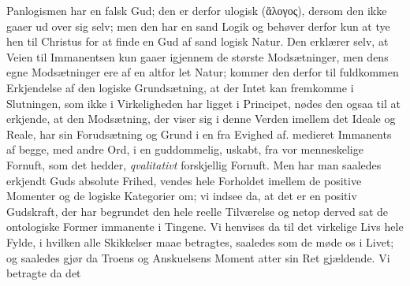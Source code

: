 \documentclass[12pt]{book}
\newcommand{\opage}[1]{\marginnote{\footnotesize\textit{[#1]}}}
\begin{document}
\opage{145} %
Panlogismen har en falsk Gud; den er derfor ulogisk (ἄλογος), dersom den ikke
gaaer ud over sig selv; men den har en sand Logik og behøver derfor kun at tye
hen til Christus for at finde en Gud af sand logisk Natur. Den erklærer selv, at
Veien til Immanentsen kun gaaer igjennem de største Modsætninger, men dens egne
Modsætninger ere af en altfor let Natur; kommer den derfor til fuldkommen
Erkjendelse af den logiske Grundsætning, at der Intet kan fremkomme i Slutningen,
som ikke i Virkeligheden har ligget i Principet, nødes den ogsaa til at erkjende,
at den Modsætning, der viser sig i denne Verden imellem det Ideale og Reale, har
sin Forudsætning og Grund i en fra Evighed af. medieret Immanents af begge, med
andre Ord, i en guddommelig, uskabt, fra vor menneskelige Fornuft, som det
hedder, \emph{qvalitativt} forskjellig Fornuft. Men har man saaledes erkjendt
Guds absolute Frihed, vendes hele Forholdet imellem de positive Momenter og de
logiske Kategorier om; vi indsee da, at det er en positiv Gudskraft, der har
begrundet den hele reelle Tilværelse og netop derved sat de ontologiske Former
immanente i Tingene. Vi henvises da til det virkelige Livs hele Fylde, i hvilken
alle Skikkelser maae betragtes, saaledes som de møde os i Livet; og saaledes gjør
da Troens og Anskuelsens Moment atter sin Ret gjældende. Vi betragte da det
\end{document}
